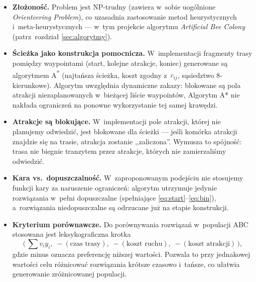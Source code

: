 \begin{itemize}
    \item \textbf{Złożoność.} Problem jest NP-trudny (zawiera w~sobie
          uogólnione \emph{Orienteering Problem}), co uzasadnia
          zastosowanie metod heurystycznych i~meta-heurystycznych
          --- w~tym projekcie algorytmu \emph{Artificial Bee Colony}
          (patrz~rozdział \ref{sec:algorytmy}).
    \item \textbf{Ścieżka jako konstrukcja pomocnicza.} W~implementacji
          fragmenty trasy pomiędzy waypointami (start, kolejne atrakcje,
          koniec) generowane są algorytmem A\textsuperscript{*}
          (najtańsza ścieżka, koszt zgodny z~$c_{ij}$, sąsiedztwo
          8-kierunkowe). Algorytm uwzględnia dynamiczne zakazy: blokowane
          są pola atrakcji niezaplanowanych w~bieżącej liście waypointów,
          Algorytm A* nie nakłada ograniczeń na ponowne
          wykorzystanie tej samej krawędzi.
    \item \textbf{Atrakcje są blokujące.} W~implementacji pole atrakcji,
          której nie planujemy odwiedzić, jest blokowane dla ścieżki ---
          jeśli komórka atrakcji znajdzie się na trasie, atrakcja zostanie
          ,,zaliczona''. Wymusza to spójność: trasa nie biegnie tranzytem
          przez atrakcje, których nie zamierzaliśmy odwiedzić.
    \item \textbf{Kara vs.\ dopuszczalność.} W~zaproponowanym podejściu nie
          stosujemy funkcji kary za naruszenie ograniczeń: algorytm utrzymuje
          jedynie rozwiązania w~pełni dopuszczalne (spełniające
          \eqref{eq:start}--\eqref{eq:bin}), a~rozwiązania niedopuszczalne
          są odrzucane już na etapie konstrukcji.
    \item \textbf{Kryterium porównawcze.} Do porównywania rozwiązań
          w~populacji ABC stosowana jest leksykograficzna krotka
          \[
              \big(\,
                  \textstyle\sum v_i y_i,\;
                  -(\text{czas trasy}),\;
                  -(\text{koszt ruchu}),\;
                  -(\text{koszt atrakcji})
              \,\big),
          \]
          gdzie minus oznacza preferencję niższej wartości. Pozwala to przy
          jednakowej wartości celu różnicować rozwiązania krótsze czasowo
          i~tańsze, co ułatwia generowanie zróżnicowanej populacji.
\end{itemize}
